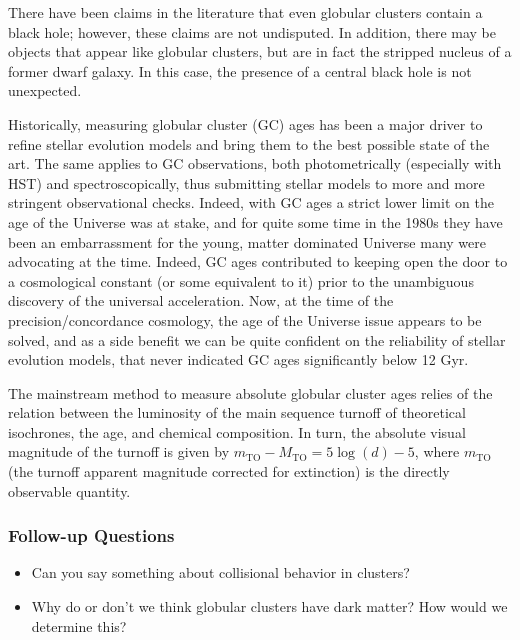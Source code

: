 \documentclass[a4paper,10pt]{article}
\begin{document}
{\noindent}There have been claims in the literature that even globular clusters contain a black hole; however, these claims are not undisputed. In addition, there may be objects that appear like globular clusters, but are in fact the stripped nucleus of a former dwarf galaxy. In this case, the presence of a central black hole is not unexpected.

{\noindent}Historically, measuring globular cluster (GC) ages has been a major driver to refine stellar evolution models and bring them to the best possible state of the art. The same applies to GC observations, both photometrically (especially with HST) and spectroscopically, thus submitting stellar models to more and more stringent observational checks. Indeed, with GC ages a strict lower limit on the age of the Universe was at stake, and for quite some time in the 1980s they have been an embarrassment for the young, matter dominated Universe many were advocating at the time. Indeed, GC ages contributed to keeping open the door to a cosmological constant (or some equivalent to it) prior to the unambiguous discovery of the universal acceleration. Now, at the time of the precision/concordance cosmology, the age of the Universe issue appears to be solved, and as a side benefit we can be quite confident on the reliability of stellar evolution models, that never indicated GC ages significantly below 12 Gyr.

{\noindent}The mainstream method to measure absolute globular cluster ages relies of the relation between the luminosity of the main sequence turnoff of theoretical isochrones, the age, and chemical composition. In turn, the absolute visual magnitude of the turnoff is given by $m_\mathrm{TO} - M_\mathrm{TO} = 5\log(d)-5$, where $m_\mathrm{TO}$ (the turnoff apparent magnitude corrected for extinction) is the directly observable quantity.


\subsubsection{Follow-up Questions}

\begin{itemize}
    \item Can you say something about collisional behavior in clusters?
    \item Why do or don't we think globular clusters have dark matter? How would we determine this? 
\end{itemize}

\end{document}
